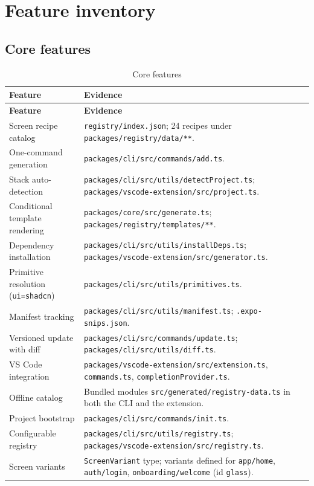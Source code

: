 \section{Feature inventory}

\subsection*{Core features}
\begin{longtable}{@{}L{4.4cm}L{10cm}@{}}
\caption{Core features}\\
\toprule
\textbf{Feature} & \textbf{Evidence} \\
\midrule
\endfirsthead
\toprule
\textbf{Feature} & \textbf{Evidence} \\
\midrule
\endhead
Screen recipe catalog & \texttt{registry/index.json}; 24 recipes under \texttt{packages/registry/data/**}. \\
One-command generation & \texttt{packages/cli/src/commands/add.ts}. \\
Stack auto-detection & \texttt{packages/cli/src/utils/detectProject.ts}; \texttt{packages/vscode-extension/src/project.ts}. \\
Conditional template rendering & \texttt{packages/core/src/generate.ts}; \texttt{packages/registry/templates/**}. \\
Dependency installation & \texttt{packages/cli/src/utils/installDeps.ts}; \texttt{packages/vscode-extension/src/generator.ts}. \\
Primitive resolution (\texttt{ui=shadcn}) & \texttt{packages/cli/src/utils/primitives.ts}. \\
Manifest tracking & \texttt{packages/cli/src/utils/manifest.ts}; \texttt{.expo-snips.json}. \\
Versioned update with diff & \texttt{packages/cli/src/commands/update.ts}; \texttt{packages/cli/src/utils/diff.ts}. \\
VS Code integration & \texttt{packages/vscode-extension/src/extension.ts}, \texttt{commands.ts}, \texttt{completionProvider.ts}. \\
Offline catalog & Bundled modules \texttt{src/generated/registry-data.ts} in both the CLI and the extension. \\
Project bootstrap & \texttt{packages/cli/src/commands/init.ts}. \\
Configurable registry & \texttt{packages/cli/src/utils/registry.ts}; \texttt{packages/vscode-extension/src/registry.ts}. \\
Screen variants & \texttt{ScreenVariant} type; variants defined for \texttt{app/home}, \texttt{auth/login}, \texttt{onboarding/welcome} (id \texttt{glass}). \\
\bottomrule
\end{longtable}

